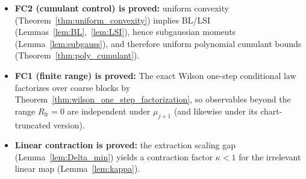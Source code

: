 \begin{itemize}
\item \textbf{FC2 (cumulant control) is proved:}
uniform convexity (Theorem~\ref{thm:uniform_convexity}) implies BL/LSI (Lemmas~\ref{lem:BL},~\ref{lem:LSI}),
hence subgaussian moments (Lemma~\ref{lem:subgauss}), and therefore uniform polynomial cumulant bounds (Theorem~\ref{thm:poly_cumulant}).

\item \textbf{FC1 (finite range) is proved:}
The exact Wilson one-step conditional law factorizes over coarse blocks by Theorem~\ref{thm:wilson_one_step_factorization}, so observables beyond the range $R_{\mathrm{fr}}=0$ are independent under $\mu_{j+1}$ (and likewise under its chart-truncated version).

\item \textbf{Linear contraction is proved:}
the extraction scaling gap (Lemma~\ref{lem:Delta_min}) yields a contraction factor $\kappa<1$ for the irrelevant linear map (Lemma~\ref{lem:kappa}).
\end{itemize}

